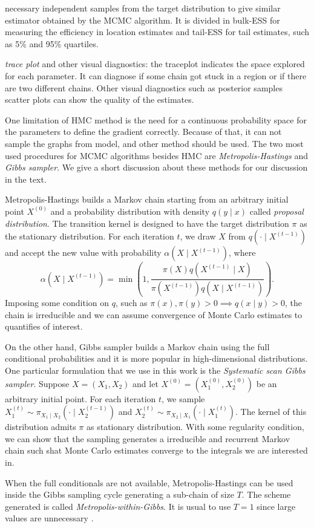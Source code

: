 \begin{alineas}
  necessary independent samples from the target distribution to give similar
  estimator obtained by the MCMC algorithm. It is divided in bulk-ESS for
  measuring the efficiency in location estimates and tail-ESS for tail
  estimates, such as 5\% and 95\% quartiles. 
  \item {\em trace plot} and other visual diagnostics: the traceplot indicates
  the space explored for each parameter. It can diagnose if some chain got
  stuck in a region or if there are two different chains. Other visual
  diagnostics such as posterior samples scatter plots can show the quality of
  the estimates.
\end{alineas}

One limitation of HMC method is the need for a continuous probability space
for the parameters to define 
the gradient correctly. Because of that, it can not sample the graphs from 
\textcite{crawford2016} model, and other method should be used. The two most
used procedures for MCMC algorithms besides HMC are {\em Metropolis-Hastings} and
{\em Gibbs sampler}. We give a short discussion about these methods for our
discussion in the text. 

Metropolis-Hastings builds a Markov chain starting from an arbitrary initial
point $X^{(0)}$ and a probability distribution with density $q(y \mid x)$ called {\em
proposal distribution}. The transition kernel is designed to have the target
distribution $\pi$ as the stationary distribution. For each iteration $t$, 
we draw $X$ from $q(\cdot \mid X^{(t-1)})$ and accept the new value with probability $\alpha(X \mid
X^{(t-1)})$, where 
\begin{equation}
  \label{eq:alpha-metropolis-hastings}
  \alpha(X \mid X^{(t-1)}) = \min\left(1, \frac{\pi(X)q(X^{(t-1)} \mid X)}{\pi(X^{(t-1)})q(X \mid X^{(t-1)})}\right).
\end{equation}
Imposing some condition on $q$, such as $\pi(x), \pi(y) > 0 \implies q(x \mid
y)>0$, the chain is irreducible \cite[p. 274]{robert2004monte} and we can assume
convergence of Monte Carlo estimates to quantifies of interest. 

On the other hand, Gibbs sampler builds a Markov chain using the full
conditional probabilities and it is more popular in high-dimensional
distributions. One particular formulation that we use in this work is the {\em
Systematic scan Gibbs sampler}. Suppose $X = (X_1, X_2)$ and let $X^{(0)} =
(X_1^{(0)}, X_2^{(0)})$ be an arbitrary initial point. For each iteration $t$,
we sample $X_1^{(t)} \sim \pi_{X_1 \mid X_2}(\cdot \mid X_2^{(t-1)})$ and
$X_2^{(t)} \sim \pi_{X_2 \mid X_1}(\cdot \mid X_1^{(t)})$. The kernel of this
distribution admits $\pi$ as stationary distribution. With some regularity
condition, we can show that the sampling generates a irreducible and recurrent
Markov chain such shat Monte Carlo estimates converge to the integrals we are
interested in. 

When the full conditionals are not available, Metropolis-Hastings can be used
inside the Gibbs sampling cycle generating a sub-chain of size $T$. The scheme generated is called {\em
Metropolis-within-Gibbs}. It is usual to use $T=1$ since large values are
unnecessary \cite[p. 213]{gamerman2006markov}. 